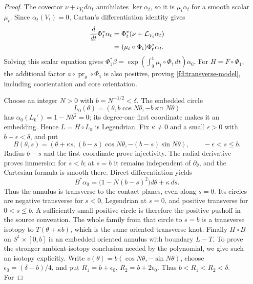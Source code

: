 \begin{proof}
The covector $\nu+\iota_{V_t}d\alpha_t$ annihilates $\ker\alpha_t$,
so it is $\mu_t\alpha_t$ for a smooth scalar $\mu_t$.
Since $\alpha_t(V_t)=0$, Cartan's differentiation identity gives
\begin{align}
 \frac{d}{dt}\Phi_t^*\alpha_t
 &=\Phi_t^*(\nu+\mathcal L_{V_t}\alpha_t)\notag\\
 &= (\mu_t\circ\Phi_t)\Phi_t^*\alpha_t.
\end{align}
Solving this scalar equation gives
$\Phi_1^*\beta=\exp(\int_0^1\mu_t\circ\Phi_t\,dt)\alpha_0$.
For $H=F\circ\Phi_1$, the additional factor
$a\circ\operatorname{pr}_\theta\circ\Phi_1$ is also positive, proving
\eqref{fd:transverse-model}, including coorientation and core orientation.

Choose an integer $N>0$ with $b=N^{-1/2}<\delta$. The embedded circle
\begin{equation}
 L_0(\theta)=(\theta,b\cos N\theta,-b\sin N\theta)
\end{equation}
has $\alpha_0(L_0')=1-Nb^2=0$; its degree-one first coordinate makes it
an embedding. Hence $L=H\circ L_0$ is Legendrian. Fix $\kappa\ne0$ and
a small $\epsilon>0$ with $b+\epsilon<\delta$, and put
\begin{equation}
 B(\theta,s)=
 (\theta+\kappa s,(b-s)\cos N\theta,-(b-s)\sin N\theta),
 \qquad -\epsilon<s\leq b.
\end{equation}
Radius $b-s$ and the first coordinate prove injectivity. The radial
derivative proves immersion for $s<b$; at $s=b$ it remains independent
of $\partial_\theta$, and the Cartesian formula is smooth there.
Direct differentiation yields
\begin{equation}\label{fd:pushoff-annulus}
 B^*\alpha_0=\bigl(1-N(b-s)^2\bigr)d\theta+\kappa\,ds.
\end{equation}
Thus the annulus is transverse to the contact planes, even along $s=0$.
Its circles are negative transverse for $s<0$, Legendrian at $s=0$,
and positive transverse for $0<s\leq b$. A sufficiently small positive
circle is therefore the positive pushoff in the source convention.
The whole family from that circle to $s=b$ is a transverse isotopy to
$T(\theta+\kappa b)$, which is the same oriented transverse knot.
Finally $H\circ B$ on $S^1\times[0,b]$ is an embedded oriented annulus
with boundary $L-T$. To prove the stronger ambient-isotopy conclusion
needed by the polynomial, we give such an isotopy explicitly.
Write $v(\theta)=b(\cos N\theta,-\sin N\theta)$, choose
$\epsilon_0=(\delta-b)/4$, and put
$R_1=b+\epsilon_0$, $R_2=b+2\epsilon_0$.
Thus $b<R_1<R_2<\delta$. For

\end{proof}
